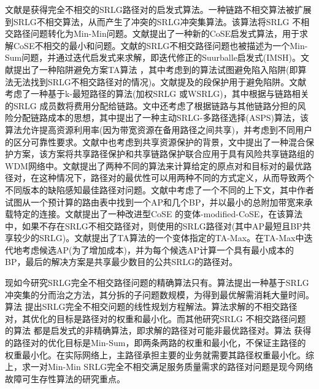 文献是获得完全不相交的SRLG路径对的启发式算法。一种链路不相交算法被扩展到SRLG不相交算法\cite{rostami2007cose}，从而产生了冲突的SRLG冲突集算法。该算法将SRLG 不相交路径问题转化为Min-Min问题。文献提出了一种新的CoSE启发式算法，用于求解CoSE不相交的最小和问题。文献的SRLG不相交路径问题也被描述为一个Min-Sum问题，并通过迭代启发式来求解，即迭代修正的Suurballe启发式(IMSH)。文献提出了一种陷阱避免方案TA算法 ，其中考虑到的算法试图避免陷入陷阱(即算法无法找到SRLG不相交路径对的情况)。文献提及的段保护用于避免陷阱。文献考虑了一种基于k-最短路径的算法(加权SRLG 或WSRLG)，其中根据与链路相关的SRLG 成员数将费用分配给链路。文中还考虑了根据链路与其他链路分担的风险分配链路成本的思想，其中提出了一种主动SRLG-多路径选择(ASPS)算法，该算法允许提高资源利用率(因为带宽资源在备用路径之间共享)，并考虑到不同用户的区分可靠性要求。文献中也考虑到共享资源保护的背景，文中提出了一种混合保护方案，该方案将共享路径保护和共享链路保护联合应用于具有风险共享链路组的WDM网络中。文献提出了两种不同的算法来计算给定的原点对和目标对的最优路径对，在这种情况下，路径对的最优性可以用两种不同的方式定义，从而导致两个不同版本的缺陷感知最佳路径对问题。文献中考虑了一个不同的上下文，其中作者试图从一个预计算的路由表中找到一个AP和几个BP，并以最小的总附加带宽来承载特定的连接。文献提出了一种改进型CoSE 的变体-modified-CoSE，在该算法中，如果不存在SRLG不相交路径对，则使用的SRLG路径对(其中AP最短且BP共享较少的SRLG)。文献提出了TA算法\cite{xu2003trap}的一个变体指定的TA-Max。在TA-Max中迭代地考虑候选AP(为了增加成本)，并为每个候选AP计算一个具有最小成本的BP，最后的解决方案是共享最少数目的公共SRLG的路径对。


现如今研究SRLG完全不相交路径问题的精确算法只有\cite{rostami2007cose,hu2003diverse,todimala2004imsh}。算法提出一种基于SRLG冲突集的分而治之方法，其分拆的子问题数规模，为得到最优解需消耗大量时间。算法 提出SRLG完全不相交问题的线性规划方程解法。算法求解的不相交路径对，其优化的目标是路径对的权重和最小化。而其他研究SRLG 不相交路径问题的算法 都是启发式的非精确算法，即求解的路径对可能非最优路径对。算法 获得的路径对的优化目标是Min-Sum，即两条两路的权重和最小化，不保证主路径的权重最小化。在实际网络上，主路径承担主要的业务就需要其路径权重最小化。综上，求一对Min-Min SRLG完全不相交满足服务质量需求的路径对问题是现今网络故障可生存性算法的研究重点。

